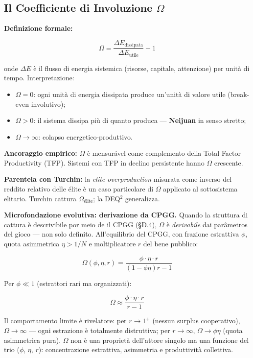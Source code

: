 \subsection{\texorpdfstring{Il Coefficiente di Involuzione
\(\Omega\)}{Il Coefficiente di Involuzione \textbackslash Omega}}\label{il-coefficiente-di-involução-omega}

\Proved{} \textbf{Definizione formale:}

\[
\Omega = \frac{\Delta E_{\text{dissipata}}}{\Delta E_{\text{utile}}} - 1
\]

onde \(\Delta E\) è il flusso di energia sistemica (risorse, capitale,
attenzione) per unità di tempo. Interpretazione:

\begin{itemize}
\tightlist
\item
  \(\Omega = 0\): ogni unità di energia dissipata produce un'unità di
  valore utile (break-even involutivo);
\item
  \(\Omega > 0\): il sistema dissipa più di quanto produca ---
  \textbf{Neijuan} in senso stretto;
\item
  \(\Omega \to \infty\): colapso energetico-produttivo.
\end{itemize}

\Hypoth{} \textbf{Ancoraggio empirico:} \(\Omega\) è mensurável come
complemento della Total Factor Productivity (TFP). Sistemi con TFP in
declino persistente hanno \(\Omega\) crescente.

\Hypoth{} \textbf{Parentela con Turchin:} la \emph{elite overproduction}
misurata come inverso del reddito relativo delle élite è un caso
particolare di \(\Omega\) applicato al sottosistema elitario. Turchin
cattura \(\Omega_{\text{élite}}\); la DEQ$^2$ generalizza.

\Proved{} \textbf{Microfondazione evolutiva: derivazione da CPGG.}
Quando la struttura di cattura è descrivibile por meio de il CPGG
(§D.4), \(\Omega\) è \emph{derivabile} dai parâmetros del gioco ---
non solo definito. All'equilibrio del CPGG, con frazione estrattiva
\(\phi\), quota asimmetrica \(\eta > 1/N\) e moltiplicatore \(r\) del
bene pubblico:

\[
\Omega(\phi,\eta,r) = \frac{\phi\cdot\eta\cdot r}{(1-\phi\eta)r - 1}
\]

Per \(\phi \ll 1\) (estrattori rari ma organizzati):

\[
\boxed{\Omega \approx \frac{\phi\cdot\eta\cdot r}{r-1}} \tag{P4}
\]

Il comportamento limite è rivelatore: per \(r \to 1^+\) (nessun
surplus cooperativo), \(\Omega \to \infty\) --- ogni estrazione è
totalmente distruttiva; per \(r \to \infty\), \(\Omega \to \phi\eta\)
(quota asimmetrica pura). \(\Omega\) non è una proprietà dell'attore
singolo ma una funzione del trio (\(\phi\), \(\eta\), \(r\)):
concentrazione estrattiva, asimmetria e produttività collettiva.



